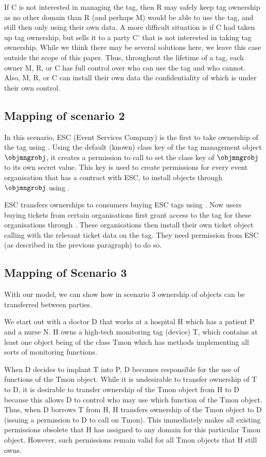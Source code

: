 If C is not interested in managing the tag, then R may safely keep tag ownership 
as no other domain than R (and perhaps M) would be able to use the tag, 
and still then only using their own data. 
A more difficult situation is if C had taken up tag ownership, but sells it to 
a party C' that is not interested in taking tag ownership. While we think there
may be several solutions here, we leave this case outside the scope of this paper.
Thus, throughout the lifetime of a tag, each owner M, R, or C has full control
over who can use the tag and who cannot. Also, M, R, or C can install their own
data the confidentiality of which is under their own control.

\subsection{Mapping of scenario 2}
In this scenario, ESC (Event Services Company) is the first to take ownership
of the tag using . Using the default (known) class key
of the tag management object $\objmngrobj$, it creates a permission to call 
 to set the class key of $\objmngrobj$ to its own 
secret value. This key is used to create permissions for every event 
organisation that has a contract with ESC, to install objects through
$\objmngrobj$ using .

ESC transfers ownerships to consumers buying ESC tags using
. Now users buying tickets from certain organisations
first grant access to the tag for these organisations through
. These organisations then install their own ticket object
calling  with the relevant ticket data on the tag. They
need permission from ESC (as described in the previous paragraph) to do so.

\subsection{Mapping of Scenario 3}

With our model, we can show how in scenario 3 ownership of objects can be
transferred between parties. 

We start out with a doctor D that works at a hospital H which has a patient P
and a nurse N. H owns a high-tech monitoring tag (device) T, which contains at
least one object being of the class Tmon which has methods implementing all
sorts of monitoring functions. 

When D decides to implant T into P, D becomes responsible for the use of
functions of the Tmon object. While it is undesirable to transfer ownership of
T to D, it is desirable to transfer ownership of the Tmon object from H to D
because this allows D to control who may use which function of the Tmon
object. Thus, when D borrows T from H, H transfers ownership of the Tmon object
to D (issuing a permission to D to call  on Tmon). 
This immediately makes all
existing permissions obsolete that H has assigned to any domain for this
particular Tmon object. However, such permissions remain valid for all Tmon
objects that H still owns. 

